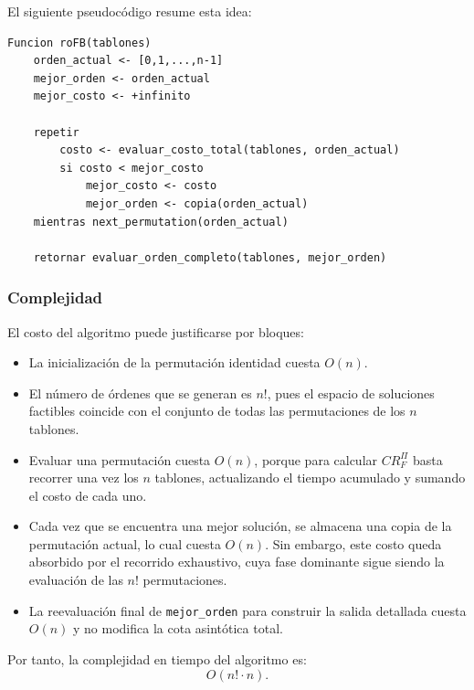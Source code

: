 \documentclass[12pt,a4paper]{article}
\begin{document}
El siguiente pseudoc\'odigo resume esta idea:

\begin{center}
\begin{minipage}{0.9\textwidth}
\begin{lstlisting}[style=pseudobloque]
Funcion roFB(tablones)
    orden_actual <- [0,1,...,n-1]
    mejor_orden <- orden_actual
    mejor_costo <- +infinito

    repetir
        costo <- evaluar_costo_total(tablones, orden_actual)
        si costo < mejor_costo
            mejor_costo <- costo
            mejor_orden <- copia(orden_actual)
    mientras next_permutation(orden_actual)

    retornar evaluar_orden_completo(tablones, mejor_orden)
\end{lstlisting}
\end{minipage}
\end{center}

\subsubsection{Complejidad}

El costo del algoritmo puede justificarse por bloques:
\begin{itemize}
  \item La inicializaci\'on de la permutaci\'on identidad cuesta \(O(n)\).
  \item El n\'umero de \'ordenes que se generan es \(n!\), pues el espacio de soluciones factibles coincide con el conjunto de todas las permutaciones de los \(n\) tablones.
  \item Evaluar una permutaci\'on cuesta \(O(n)\), porque para calcular \(CR_F^\Pi\) basta recorrer una vez los \(n\) tablones, actualizando el tiempo acumulado y sumando el costo de cada uno.
  \item Cada vez que se encuentra una mejor soluci\'on, se almacena una copia de la permutaci\'on actual, lo cual cuesta \(O(n)\). Sin embargo, este costo queda absorbido por el recorrido exhaustivo, cuya fase dominante sigue siendo la evaluaci\'on de las \(n!\) permutaciones.
  \item La reevaluaci\'on final de \texttt{mejor\_orden} para construir la salida detallada cuesta \(O(n)\) y no modifica la cota asint\'otica total.
\end{itemize}

Por tanto, la complejidad en tiempo del algoritmo es:
\[
O(n! \cdot n).
\]
\end{document}

